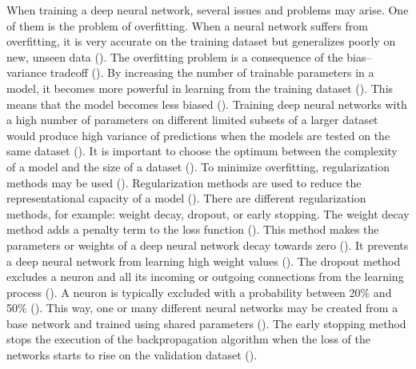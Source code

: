 \documentclass{BachelorBUI}
\begin{document}
                When training a deep neural network, several issues and problems may arise. One of them is the problem of overfitting. When a neural network suffers from overfitting, it is very accurate on the training dataset but generalizes poorly on new, unseen data (\cite{Aggarwal:2018}). The overfitting problem is a consequence of the bias--variance tradeoff (\cite{Aggarwal:2018}). By increasing the number of trainable parameters in a model, it becomes more powerful in learning from the training dataset (\cite{Aggarwal:2018}). This means that the model becomes less biased (\cite{Aggarwal:2018}). Training deep neural networks with a high number of parameters on different limited subsets of a larger dataset would produce high variance of predictions when the models are tested on the same dataset (\cite{Aggarwal:2018}). It is important to choose the optimum between the complexity of a model and the size of a dataset (\cite{Aggarwal:2018}). To minimize overfitting, regularization methods may be used (\cite{Aggarwal:2018}). Regularization methods are used to reduce the representational capacity of a model (\cite{Goodfellow:2016}). There are different regularization methods, for example: weight decay, dropout, or early stopping. The weight decay method adds a penalty term to the loss function (\cite{Bishop:2024}). This method makes the parameters or weights of a deep neural network decay towards zero (\cite{Bishop:2024}). It prevents a deep neural network from learning high weight values (\cite{Bishop:2024}). The dropout method excludes a neuron and all its incoming or outgoing connections from the learning process (\cite{Aggarwal:2018}). A neuron is typically excluded with a probability between 20\% and 50\% (\cite{Aggarwal:2018}). This way, one or many different neural networks may be created from a base network and trained using shared parameters (\cite{Aggarwal:2018}). The early stopping method stops the execution of the backpropagation algorithm when the loss of the networks starts to rise on the validation dataset (\cite{Murphy:2022}).
\end{document}
